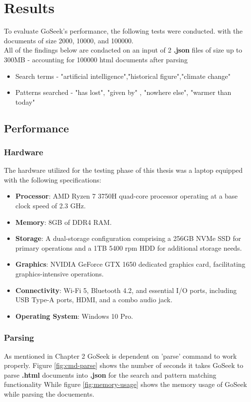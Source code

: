 \chapter{Results}
To evaluate GoSeek's performance, the following tests were conducted. with the documents of size 2000, 10000, and 100000. \\
All of the findings below are condacted on an input of 2 \textbf{.json} files of size up to 300MB - accounting for 100000 html documents after parsing
\begin{itemize}
    \item Search terms - "artificial intelligence","historical figure","climate change"
    \item Patterns searched - "has lost", "given by" , "nowhere else", "warmer than today"
\end{itemize}
\section{Performance}
\subsection{Hardware}
The hardware utilized for the testing phase of this thesis was a laptop equipped with the following specifications:

\begin{itemize}
    \item \textbf{Processor}: AMD Ryzen 7 3750H quad-core processor operating at a base clock speed of 2.3 GHz.
    \item \textbf{Memory}: 8GB of DDR4 RAM.
    \item \textbf{Storage}: A dual-storage configuration comprising a 256GB NVMe SSD for primary operations and a 1TB 5400 rpm HDD for additional storage needs.
    \item \textbf{Graphics}: NVIDIA GeForce GTX 1650 dedicated graphics card, facilitating graphics-intensive operations.
    \item \textbf{Connectivity}: Wi-Fi 5, Bluetooth 4.2, and essential I/O ports, including USB Type-A ports, HDMI, and a combo audio jack.
    \item \textbf{Operating System}: Windows 10 Pro.
\end{itemize}
\subsection{Parsing}
As mentioned in Chapter 2 GoSeek is dependent on 'parse' command to work properly. Figure \ref{fig:cmd-parse} shows the number of seconds it takes GoSeek to parse \textbf{.html} documents into \textbf{.json} for the search and pattern matching functionality While 
figure \ref{fig:memory-usage} shows the memory usage of GoSeek while parsing the docuements.

